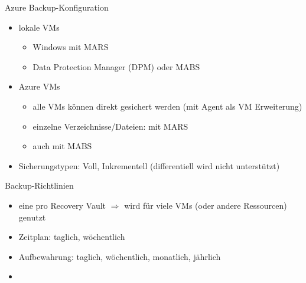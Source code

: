 \begin{flashcard}[Definition]{Azure Backup-Konfiguration}
  \begin{itemize}
    \item lokale VMs
      \begin{itemize}
        \item Windows mit MARS
        \item Data Protection Manager (DPM) oder MABS
      \end{itemize}
    \item Azure VMs
      \begin{itemize}
        \item alle VMs können direkt gesichert werden (mit Agent als VM Erweiterung)
        \item einzelne Verzeichnisse/Dateien: mit MARS
        \item auch mit MABS
      \end{itemize}
    \item Sicherungstypen: Voll, Inkrementell (differentiell wird nicht unterstützt)
  \end{itemize}
\end{flashcard}

\begin{flashcard}[Definition]{Backup-Richtlinien}
  \begin{itemize}
    \item eine pro Recovery Vault\newline
      $\Rightarrow$ wird für viele VMs (oder andere Ressourcen) genutzt
    \item Zeitplan: taglich, wöchentlich
    \item Aufbewahrung: taglich, wöchentlich, monatlich, jährlich
  \end{itemize}
\end{flashcard}



\begin{flashcard}[Definition]{}
  \begin{itemize}
    \item 
  \end{itemize}
\end{flashcard}

